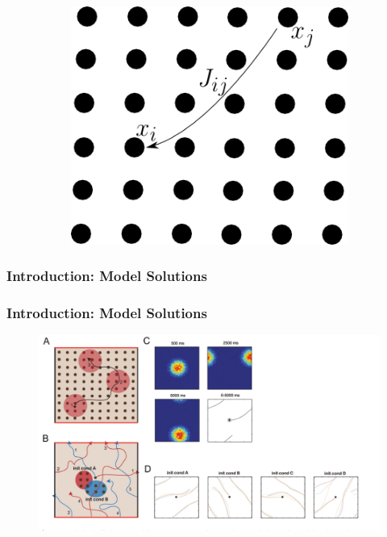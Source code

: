 \documentclass{beamer}
\begin{document}
\begin{frame}
\begin{itemize}
\begin{figure}
\begin{subfigure}[t]{0.3\textwidth}
                    \includegraphics[width=\linewidth]{itskov_lattice.png}
                    \vspace{.1in}
                    \label{fig:sub2}
                \end{subfigure}
\end{figure}
\end{itemize}
\end{frame}

\begin{frame}
\frametitle{Introduction: Model Solutions}
\begin{center}
\end{center}
\end{frame}


\begin{frame}
\frametitle{Introduction: Model Solutions}
\begin{figure}
 \centering
 \includegraphics[width=.9\textwidth]{itskov_etal_2011_model.png}
 \caption{ \cite{itskov_2011_cell}}
\end{figure}
\end{frame}
\end{document}
